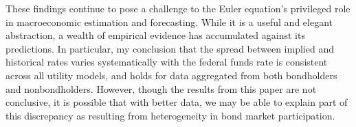 These findings continue to pose a challenge to the Euler equation's privileged role in macroeconomic estimation and forecasting. While it is a useful and elegant abstraction, a wealth of empirical evidence has accumulated against its predictions. In particular, my conclusion that the spread between implied and historical rates varies systematically with the federal funds rate is consistent across all utility models, and holds for data aggregated from both bondholders and nonbondholders. However, though the results from this paper are not conclusive, it is possible that with better data, we may be able to explain part of this discrepancy as resulting from heterogeneity in bond market participation.
